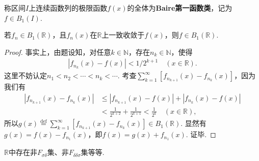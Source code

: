 \documentclass[../../main.tex]{subfiles}
\begin{document}
\begin{definition}[Baire第一函数类]
称区间$I$上连续函数列的极限函数$f(x)$的全体为\textbf{Baire第一函数类}，记为$f\in B_1(I)$.
\end{definition}

\begin{theorem}\label{theorem:Baire第一函数类的性质1}
若$f_n\in B_1(\mathbb{R})$，且$f_n(x)$在$\mathbb{R}$上一致收敛于$f(x)$，则$f\in B_1(\mathbb{R})$.
\end{theorem}
\begin{proof}
事实上，由题设知，对任意$k\in\mathbb{N}$，存在$n_k\in\mathbb{N}$，使得
\begin{align*}
|f_{n_k}(x)-f(x)|<1/2^{k + 1} \quad (x\in\mathbb{R}).
\end{align*}
这里不妨认定$n_1 < n_2 < \cdots < n_k < \cdots$. 考查$\sum_{k = 1}^{\infty}[f_{n_{k + 1}}(x)-f_{n_k}(x)]$，因为我们有
\begin{align*}
|f_{n_{k + 1}}(x)-f_{n_k}(x)| &\leqslant |f_{n_{k + 1}}(x)-f(x)|+|f_{n_k}(x)-f(x)| \\
&<\frac{1}{2^{k + 2}}+\frac{1}{2^{k + 1}}<\frac{1}{2^{k}} \quad (x\in\mathbb{R}),
\end{align*}
所以$g(x)\stackrel{\text{def}}{=}\sum_{k = 1}^{\infty}[f_{n_{k + 1}}(x)-f_{n_k}(x)]\in B_1(\mathbb{R})$. 显然有$g(x)=f(x)-f_{n_1}(x)$，即$f(x)=g(x)+f_{n_1}(x)$. 证毕.

\end{proof}

\begin{proposition}
$\mathbb{R}$中存在非$F_{\sigma\delta}$集、非$F_{\delta\delta\sigma}$集等等. 
\end{proposition}
\end{document}
